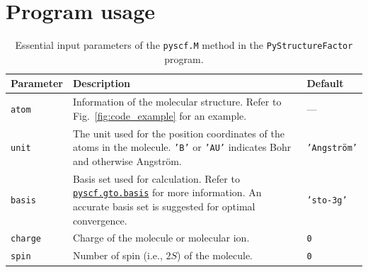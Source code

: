 \documentclass[preprint,12pt]{elsarticle} %
\begin{document}
\section{Program usage}
\label{sec:usage}

\begin{table}[tb]
    \small
    \centering
    \begin{tabular}{l p{9cm} l}
        \hline \hline
        Parameter                   & Description                                                                                       & Default\\
        \hline
        \texttt{atom}               & Information of the molecular structure. Refer to Fig.~\ref{fig:code_example} for an example.      & ---\\
        \texttt{unit}               & The unit used for the position coordinates of the atoms in the molecule.
                                      \texttt{'B'} or \texttt{'AU'} indicates Bohr and otherwise Angstr\"om.                            & \texttt{'Angstr\"om'}\\
        \texttt{basis}              & Basis set used for calculation.
                                      Refer to \href{https://pyscf.org/pyscf_api_docs/pyscf.gto.basis.html}{\texttt{pyscf.gto.basis}}
                                      for more information.
                                      An accurate basis set is suggested for optimal convergence.                                       & \texttt{'sto-3g'}\\
        \texttt{charge}             & Charge of the molecule or molecular ion.                                                          & \texttt{0} \\
        \texttt{spin}               & Number of spin (i.e., $2S$) of the molecule.                                                      & \texttt{0} \\
        \hline \hline
    \end{tabular}
    \caption{Essential input parameters of the \texttt{pyscf.M} method in the \texttt{PyStructureFactor} program.}
    \label{tab:pyscfm_param}
\end{table}
\end{document}

